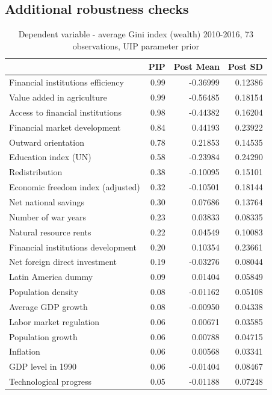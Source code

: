 \documentclass[a4paper,11pt]{article}
\begin{document}
\subsection*{Additional robustness checks}
\label{sec:app_rch}
\begin{table}[!ht]
\footnotesize
\centering
\caption{Dependent variable - average Gini index (wealth) 2010-2016, 73 observations, UIP parameter prior}
\label{table:res2}
\begin{tabular}{lrrr}
  \toprule
 & PIP & Post Mean & Post SD \\ 
  \midrule
  Financial institutions efficiency & 0.99 & -0.36999 & 0.12386 \\ 
  Value added in agriculture & 0.99 & -0.56485 & 0.18154 \\ 
  Access to financial institutions & 0.98 & -0.44382 & 0.16204 \\ 
  Financial market development & 0.84 & 0.44193 & 0.23922 \\ 
  Outward orientation & 0.78 & 0.21853 & 0.14535 \\ 
  Education index (UN) & 0.58 & -0.23984 & 0.24290 \\ 
  Redistribution & 0.38 & -0.10095 & 0.15101 \\ 
  Economic freedom index (adjusted) & 0.32 & -0.10501 & 0.18144 \\ 
  Net national savings & 0.30 & 0.07686 & 0.13764 \\ 
  Number of war years & 0.23 & 0.03833 & 0.08335 \\ 
  Natural resource rents & 0.22 & 0.04549 & 0.10083 \\ 
  Financial institutions development & 0.20 & 0.10354 & 0.23661 \\ 
  Net foreign direct investment & 0.19 & -0.03276 & 0.08044 \\ 
  Latin America dummy & 0.09 & 0.01404 & 0.05849 \\ 
  Population density & 0.08 & -0.01162 & 0.05108 \\ 
  Average GDP growth & 0.08 & -0.00950 & 0.04338 \\ 
  Labor market regulation & 0.06 & 0.00671 & 0.03585 \\ 
  Population growth & 0.06 & 0.00788 & 0.04715 \\ 
  Inflation & 0.06 & 0.00568 & 0.03341 \\ 
  GDP level in 1990 & 0.06 & -0.01404 & 0.08467 \\ 
  Technological progress & 0.05 & -0.01188 & 0.07248 \\ 

\end{tabular}
\end{table}
\end{document}
